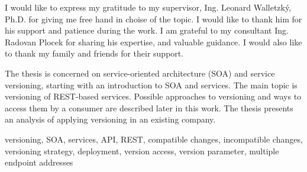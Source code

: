 \documentclass[10pt,final,oneside]{fithesis2}
\begin{document}
\FrontMatter
\ThesisTitlePage


\begin{ThesisDeclaration}
  \DeclarationText
  \AdvisorName
\end{ThesisDeclaration}


\begin{ThesisThanks}
I would like to express my gratitude to my supervisor, Ing. Leonard Walletzký, Ph.D. for giving me free hand in choise of the topic. I would like to thank him for his support and patience during the work. I am grateful to my consultant Ing. Radovan Plocek for sharing his expertise, and valuable guidance. I would also like to thank my family and friends for their support.
\end{ThesisThanks}

\begin{ThesisAbstract}
The thesis is concerned on service-oriented architecture (SOA) and service versioning, starting with an introduction to SOA and services. The main topic is versioning of REST-based services. Possible approaches to versioning and ways to access them by a consumer are described later in this work. The thesis presents an analysis of applying versioning in an existing company.
\end{ThesisAbstract}

\begin{ThesisKeyWords}
versioning, SOA, services, API, REST, compatible changes, incompatible changes, versioning strategy, deployment, version access, version parameter, multiple endpoint addresses
\end{ThesisKeyWords}

\MainMatter

\tableofcontents











\printindex
\printglossary[type=\acronymtype,title={Abbrevations}]
\printglossary
\listoffigures
\listoftables
\end{document}
